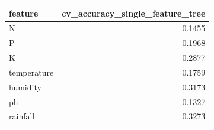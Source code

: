 \begin{tabular}{lr}
\toprule
feature & cv_accuracy_single_feature_tree \\
\midrule
N & 0.1455 \\
P & 0.1968 \\
K & 0.2877 \\
temperature & 0.1759 \\
humidity & 0.3173 \\
ph & 0.1327 \\
rainfall & 0.3273 \\
\bottomrule
\end{tabular}
